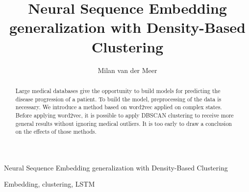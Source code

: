 \documentclass[journal]{IEEETemplate/IEEEtran}
\begin{document}
%
\title{Neural Sequence Embedding generalization with Density-Based Clustering}
%
%
%

\author{Milan van der Meer}%




\markboth{}%
{Neural Sequence Embedding generalization with Density-Based Clustering}
% 



\maketitle

\begin{abstract}
Large medical databases give the opportunity to build models for predicting the disease progression of a patient. To build the model, preprocessing of the data is necessary. We introduce a method based on word2vec applied on complex states. Before applying word2vec, it is possible to apply DBSCAN clustering to receive more general results without ignoring medical outliers. It is too early to draw a conclusion on the effects of those methods.
\end{abstract}

\begin{IEEEkeywords}
Embedding, clustering, LSTM
\end{IEEEkeywords}
\end{document}
